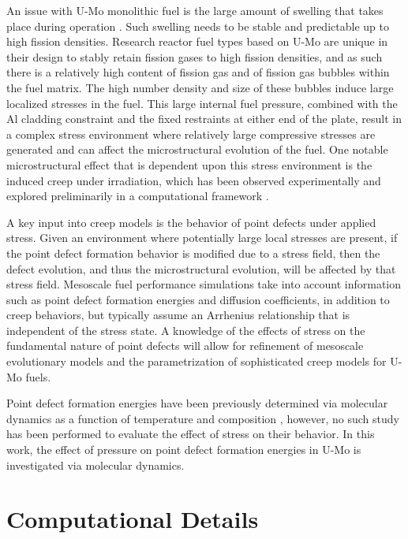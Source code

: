 \documentclass[11pt, oneside]{elsarticle}
\begin{document}
An issue with U-Mo monolithic fuel is the large amount of swelling that takes place during operation \cite{hofman1997}. Such swelling needs to be stable and predictable up to high fission densities. Research reactor fuel types based on U-Mo are unique in their design to stably retain fission gases to high fission densities, and as such there is a relatively high content of fission gas and of fission gas bubbles within the fuel matrix. The high number density and size of these bubbles induce large localized stresses in the fuel. This large internal fuel pressure, combined with the Al cladding constraint and the fixed restraints at either end of the plate, result in a complex stress environment where relatively large compressive stresses are generated and can affect the microstructural evolution of the fuel. One notable microstructural effect that is dependent upon this stress environment is the induced creep under irradiation, which has been observed experimentally \cite{kim2013} and explored preliminarily in a computational framework \cite{xmiao2021, xjian2019}. 

A key input into creep models is the behavior of point defects under applied stress. Given an environment where potentially large local stresses are present, if the point defect formation behavior is modified due to a stress field, then the defect evolution, and thus the microstructural evolution, will be affected by that stress field. Mesoscale fuel performance simulations \cite{ye2018, hu2017a} take into account information such as point defect formation energies and diffusion coefficients, in addition to creep behaviors, but typically assume an Arrhenius relationship that is independent of the stress state. A knowledge of the effects of stress on the fundamental nature of point defects will allow for refinement of mesoscale evolutionary models and the parametrization of sophisticated creep models for U-Mo fuels. 

Point defect formation energies have been previously determined via molecular dynamics as a function of temperature and composition \cite{park2021}, however, no such study has been performed to evaluate the effect of stress on their behavior. In this work, the effect of pressure on point defect formation energies in U-Mo is investigated via molecular dynamics. 


\section{Computational Details}\label{sec2}
\end{document}
